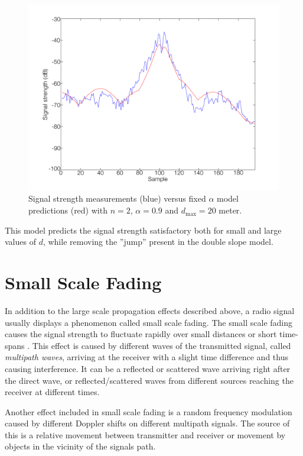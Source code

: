 \documentclass{LTHthesis}
\begin{document}
 \begin{figure}[!hbt]

\includegraphics[width=1\textwidth ]{images/signal_model/fixed_alpha}
\caption{Signal strength measurements (blue) versus fixed $\alpha$ model predictions (red) with $n=2$, $\alpha=0.9$ and $d_{\text{max}}=20$ meter.}\label{fixed_alpha}
\end{figure}

This model predicts the signal strength satisfactory both for small and large values of $d$, while removing the ''jump'' present in the double slope model.
 \section{Small Scale Fading}
In addition to the large scale propagation effects described above, a radio signal usually displays a phenomenon called small scale fading. The small scale fading causes the signal strength to fluctuate rapidly over small distances or short time-spans \cite{rappaport96}. This effect is caused by different waves of the transmitted signal, called \emph{multipath waves}, arriving at the receiver with a slight time difference and thus causing interference. It can be a reflected or scattered wave arriving right after the direct wave, or reflected/scattered waves from different sources reaching the receiver at different times. 

Another effect included in small scale fading is a random frequency modulation caused by different Doppler shifts on different multipath signals. The source of this is a relative movement between transmitter and receiver or movement by objects in the vicinity of the signals path. 
\end{document}

